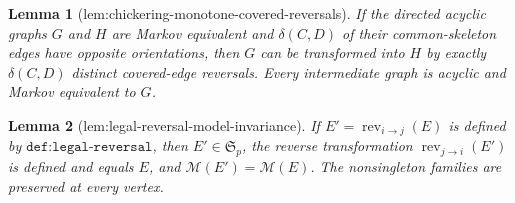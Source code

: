 \documentclass{article}
\newtheorem{lemma}{Lemma}
\begin{document}
\begin{lemma}[lem:chickering-monotone-covered-reversals]\label{lem:chickering-monotone-covered-reversals}
If the directed acyclic graphs \(G\) and \(H\) are Markov equivalent and \(\delta(C,D)\) of their common-skeleton edges have opposite orientations, then \(G\) can be transformed into \(H\) by exactly \(\delta(C,D)\) distinct covered-edge reversals. Every intermediate graph is acyclic and Markov equivalent to \(G\).
\end{lemma}

\begin{lemma}[lem:legal-reversal-model-invariance]\label{lem:legal-reversal-model-invariance}
If \(E' = \operatorname{rev}_{i\to j}(E)\) is defined by \(\texttt{def:legal-reversal}\), then \(E'\in\mathfrak S_p\), the reverse transformation \(\operatorname{rev}_{j\to i}(E')\) is defined and equals \(E\), and \(\mathcal M(E')=\mathcal M(E)\). The nonsingleton families are preserved at every vertex.
\end{lemma}
\end{document}
